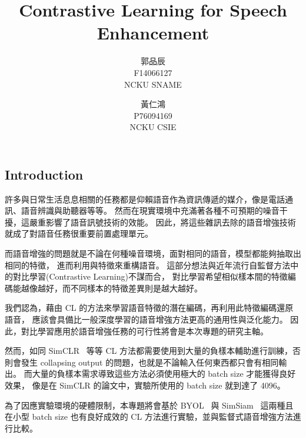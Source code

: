 \documentclass[10pt,twocolumn,letterpaper]{article}
\begin{document}
\begin{CJK}{UTF8}{bkai}
   \title{Contrastive Learning for Speech Enhancement}

   \author{
      郭品辰\\
      F14066127\\
      NCKU SNAME
      \and
      黃仁鴻\\
      P76094169\\
      NCKU CSIE
   }

   \maketitle



   \section{Introduction}

   許多與日常生活息息相關的任務都是仰賴語音作為資訊傳遞的媒介，像是電話通訊、語音辨識與助聽器等等。
   然而在現實環境中充滿著各種不可預期的噪音干擾，這嚴重影響了語音訊號技術的效能。
   因此，將這些雜訊去除的語音增強技術就成了對語音任務很重要前置處理單元。

   而語音增強的問題就是不論在何種噪音環境，面對相同的語音，模型都能夠抽取出相同的特徵，
   進而利用與特徵來重構語音。
   這部分想法與近年流行自監督方法中的對比學習(Contrastive Learning)不謀而合，
   對比學習希望相似樣本間的特徵編碼能越像越好，而不同樣本的特徵差異則是越大越好。

   我們認為，藉由 CL 的方法來學習語音特徵的潛在編碼，再利用此特徵編碼還原語音，
   應該會具備比一般深度學習的語音增強方法更高的通用性與泛化能力。
   因此，對比學習應用於語音增強任務的可行性將會是本次專題的研究主軸。

   然而，如同 SimCLR~\cite{SimCLR} 等等 CL 方法都需要使用到大量的負樣本輔助進行訓練，否則會發生
   collapsing output 的問題，也就是不論輸入任何東西都只會有相同輸出。
   而大量的負樣本需求導致這些方法必須使用極大的 batch size 才能獲得良好效果，
   像是在 SimCLR 的論文中，實驗所使用的 batch size 就到達了 4096。

   為了因應實驗環境的硬體限制，本專題將會基於 BYOL~\cite{BYOL} 與
   SimSiam~\cite{SimSiam}
   這兩種且在小型 batch size 也有良好成效的 CL 方法進行實驗，並與監督式語音增強方法進行比較。


\end{CJK}
\end{document}
